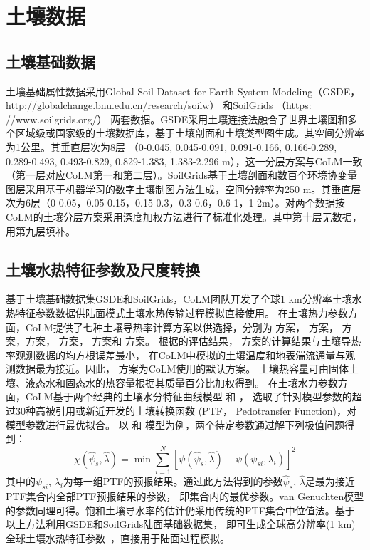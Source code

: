 \section{土壤数据}\label{土壤数据}
\subsection{土壤基础数据}\label{土壤基础数据}
土壤基础属性数据采用Global Soil Dataset for Earth System Modeling（GSDE，http://globalchange.bnu.edu.cn/research/soilw） \citep{shangguan2014global}
和SoilGrids （https:\\//www.soilgrids.org/）\citep{poggio2021soilgrids} 两套数据。GSDE采用土壤连接法融合了世界土壤图和多个区域级或国家级的土壤数据库，基于土壤剖面和土壤类型图生成。其空间分辨率为1公里。其垂直层次为8层 （0-0.045, 0.045-0.091, 0.091-0.166, 0.166-0.289, 0.289-0.493, 0.493-0.829, 0.829-1.383, 1.383-2.296 m），这一分层方案与CoLM一致（第一层对应CoLM第一和第二层）。SoilGrids基于土壤剖面和数百个环境协变量图层采用基于机器学习的数字土壤制图方法生成，空间分辨率为250 m。其垂直层次为6层（0-0.05，0.05-0.15，0.15-0.3，0.3-0.6，0.6-1，1-2m）。对两个数据按CoLM的土壤分层方案采用深度加权方法进行了标准化处理。其中第十层无数据，用第九层填补。

\subsection{土壤水热特征参数及尺度转换}\label{土壤水热特征参数及尺度转换}

基于土壤基础数据集GSDE和SoilGrids，CoLM团队开发了全球1 km分辨率土壤水热特征参数数据供陆面模式土壤水热传输过程模拟直接使用。
在土壤热力参数方面，CoLM提供了七种土壤导热率计算方案以供选择，分别为 \citet{farouki1981thermal}方案，\citet{Johansen1975} 方案，
\citet{cote2005} 方案，\citet{balland2005}方案，\citet{lu2007improved} 方案，\citet{tarnawski2012series} 方案和 \citet{de1963thermal} 方案。
根据\citet{dai2019evaluation}的评估结果，\citet{balland2005} 方案的计算结果与土壤导热率观测数据的均方根误差最小，
在CoLM中模拟的土壤温度和地表湍流通量与观测数据最为接近。因此，\citet{balland2005} 方案为CoLM使用的默认方案。
土壤热容量可由固体土壤、液态水和固态水的热容量根据其质量百分比加权得到。
在土壤水力参数方面，CoLM基于两个经典的土壤水分特征曲线模型 \citet{campbell1974} 和 \citet{van1980closed}，
选取了针对模型参数的超过30种高被引用或新近开发的土壤转换函数 (PTF， Pedotransfer Function)，对模型参数进行最优拟合。
以\citet{balland2005} 和 \citet{campbell1974} 模型为例，两个待定参数通过解下列极值问题得到：
\begin{equation}
\chi\left(\hat{\psi}_{s}, \hat{\lambda}\right)=\min \sum_{i=1}^{N}\left[\psi\left(\hat{\psi}_{s}, \hat{\lambda}\right)-\psi\left(\psi_{s i}, \lambda_{i}\right)\right]^{2}
\end{equation}
%
其中的$\psi_{s i}$, $\lambda_{i}$为每一组PTF的预报结果。通过此方法得到的参数$\hat{\psi}_{s}$, $\hat{\lambda}$是最为接近PTF集合内全部PTF预报结果的参数，
即集合内的最优参数。van Genuchten模型的参数同理可得。饱和土壤导水率的估计仍采用传统的PTF集合中位值法。基于以上方法利用GSDE和SoilGrids陆面基础数据集，
即可生成全球高分辨率(1 km)全球土壤水热特征参数~\citep{dai2019evaluation}，直接用于陆面过程模拟。


